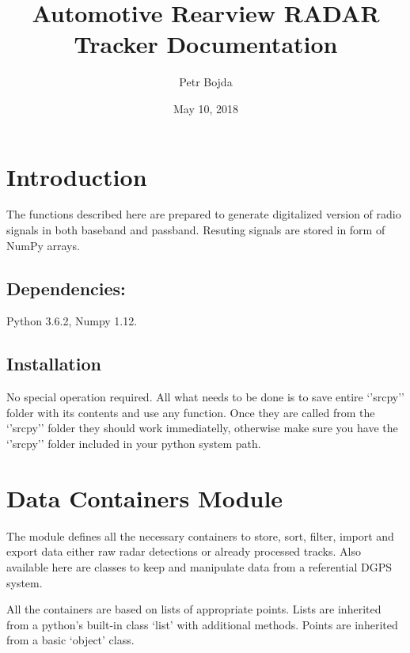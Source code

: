 \documentclass[letterpaper,10pt,english]{sphinxmanual}
\title{Automotive Rearview RADAR Tracker Documentation}
\date{May 10, 2018}
\author{Petr Bojda}
\begin{document}
\maketitle
\sphinxtableofcontents
{}\label{\detokenize{index::doc}}



\chapter{Introduction}
\label{\detokenize{intro::doc}}\label{\detokenize{intro:introduction}}\label{\detokenize{intro:welcome-to-automotive-rear-looking-radar-tracker-s-documentation}}
The functions described here are prepared to generate digitalized version of radio signals in both baseband and passband. Resuting signals are stored in form of NumPy arrays.


\section{Dependencies:}
\label{\detokenize{intro:dependencies}}
Python 3.6.2, Numpy 1.12.


\section{Installation}
\label{\detokenize{intro:installation}}
No special operation required. All what needs to be done is to save entire ‘’srcpy’’ folder with its contents and use any function. Once they are called from the ‘’srcpy’’ folder they should work immediatelly, otherwise make sure you have the ‘’srcpy’’ folder included in your python system path.


\chapter{Data Containers Module}
\label{\detokenize{datacontainers:trackpoint-label}}\label{\detokenize{datacontainers::doc}}\label{\detokenize{datacontainers:data-containers-module}}
The module defines all the necessary containers to store, sort, filter, import and export data
either raw radar detections or already processed tracks. Also available here are classes to keep
and manipulate data from a referential DGPS system.

All the containers are based on lists of appropriate points. Lists are inherited from a python’s built-in
class ‘list’ with additional methods. Points are inherited from a basic ‘object’ class.
\label{\detokenize{datacontainers:module-data_containers}}
\end{document}
